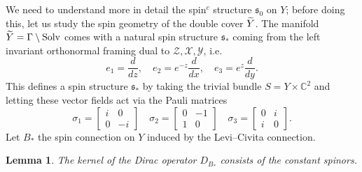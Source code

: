 \documentclass[11pt]{article}
\newtheorem{lemm}[theo]{Lemma}
\theoremstyle{definition}
\numberwithin{equation}{section}
\numberwithin{figure}{section}
\numberwithin{table}{section}
\newcommand{\Y}{\mathcal{Y}}
\newcommand{\X}{\mathcal{X}}
\newcommand{\Z}{\mathcal{Z}}
\newcommand{\spin}{\mathfrak{s}}
\let\oldtilde\tilde
\renewcommand*{\tilde}[1]{\mathchoice{\widetilde{#1}}{\widetilde{#1}}{\oldtilde{#1}}{\oldtilde{#1}}}\let\oldhat\hat
\renewcommand*{\hat}[1]{\mathchoice{\widehat{#1}}{\widehat{#1}}{\oldhat{#1}}{\oldhat{#1}}}
\begin{document}
We need to understand more in detail the spin$^c$ structure $\spin_0$ on $Y$; before doing this, let us study the spin geometry of the double cover $\tilde{Y}$. The manifold $\tilde{Y}=\Gamma\setminus\mathrm{Solv}$ comes with a natural spin structure $\spin_*$ coming from the left invariant orthonormal framing dual to $\Z,\X,\Y$, i.e.
\[
e_1=\frac{d}{dz},\quad e_2=e^{-z}\frac{d}{dx},\quad e_3=e^z\frac{d}{dy}.
\]
This defines a spin structure $\spin_*$ by taking the trivial bundle $S=Y\times \mathbb{C}^2$ and letting these vector fields act via the Pauli matrices
\[
\sigma_1=
\begin{bmatrix}
i&0\\
0&-i
\end{bmatrix}
\quad
\sigma_2=
\begin{bmatrix}
0&-1\\
1&0
\end{bmatrix}
\quad
\sigma_3=
\begin{bmatrix}
0&i\\
i&0
\end{bmatrix}.
\]
Let $B_*$ the spin connection on $Y$ induced by the Levi--Civita connection.



\begin{lemm}\label{harmonic}
The kernel of the Dirac operator $D_{B_*}$ consists of the constant spinors.
\end{lemm}
\end{document}
